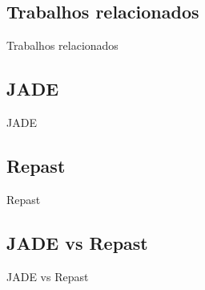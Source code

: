 
\subsection{Trabalhos relacionados}
\begin{frame}{Trabalhos relacionados}

\end{frame}

\subsection{JADE}
\begin{frame}{JADE}

\end{frame}

\subsection{Repast}
\begin{frame}{Repast}

\end{frame}

\subsection{JADE vs Repast}
\begin{frame}{JADE vs Repast}

\end{frame}

